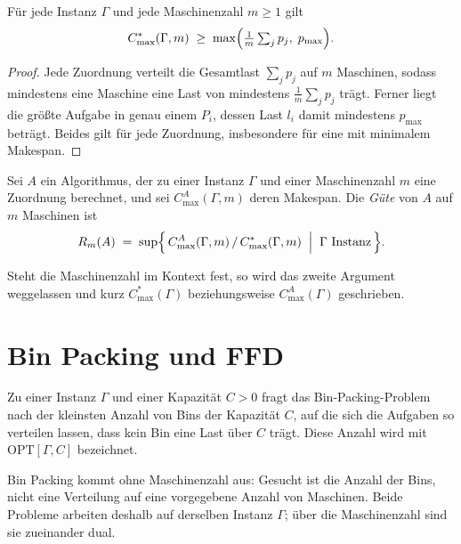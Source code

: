 \begin{lemma}
\label{lem:untere-schranken}
Für jede Instanz $\Gamma$ und jede Maschinenzahl $m \ge 1$ gilt
\[
  C^{*}_{\max}(\Gamma, m) \;\ge\; \max\Bigl( \tfrac{1}{m}\textstyle\sum_{j} p_j,\; p_{\max} \Bigr).
\]
\end{lemma}

\begin{proof}
Jede Zuordnung verteilt die Gesamtlast $\sum_j p_j$ auf $m$ Maschinen, sodass mindestens eine
Maschine eine Last von mindestens $\frac{1}{m}\sum_j p_j$ trägt.
Ferner liegt die größte Aufgabe in genau einem $P_i$, dessen Last $l_i$ damit mindestens
$p_{\max}$ beträgt.
Beides gilt für jede Zuordnung, insbesondere für eine mit minimalem Makespan.
\end{proof}

\begin{definition}[Approximationsgüte]
\label{def:guete}
Sei $A$ ein Algorithmus, der zu einer Instanz $\Gamma$ und einer Maschinenzahl $m$ eine Zuordnung
berechnet, und sei $C^{A}_{\max}(\Gamma, m)$ deren Makespan.
Die \emph{Güte} von $A$ auf $m$ Maschinen ist
\[
  R_m(A) \;=\; \sup\Bigl\{\, C^{A}_{\max}(\Gamma, m) \,/\, C^{*}_{\max}(\Gamma, m)
  \;\Bigm|\; \Gamma \text{ Instanz} \,\Bigr\}.
\]
\end{definition}

Steht die Maschinenzahl im Kontext fest, so wird das zweite Argument weggelassen und kurz
$C^{*}_{\max}(\Gamma)$ beziehungsweise $C^{A}_{\max}(\Gamma)$ geschrieben.

\section{Bin Packing und FFD}
\label{sec:binpacking}

\begin{definition}
\label{def:binpacking}
Zu einer Instanz $\Gamma$ und einer Kapazität $C > 0$ fragt das Bin-Packing-Problem nach der
kleinsten Anzahl von Bins der Kapazität $C$, auf die sich die Aufgaben so verteilen lassen, dass
kein Bin eine Last über $C$ trägt.
Diese Anzahl wird mit $\mathrm{OPT}[\Gamma, C]$ bezeichnet.
\end{definition}

Bin Packing kommt ohne Maschinenzahl aus: Gesucht ist die Anzahl der Bins, nicht eine Verteilung
auf eine vorgegebene Anzahl von Maschinen.
Beide Probleme arbeiten deshalb auf derselben Instanz $\Gamma$; über die Maschinenzahl sind sie
zueinander dual.

